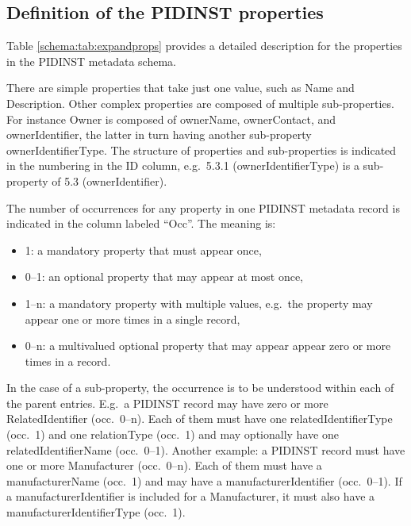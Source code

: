 \documentclass[titlepage=true,twoside=false,DIV=13]{scrartcl}
\begin{document}
\subsection{Definition of the PIDINST properties}

Table \ref{schema:tab:expandprops} provides a detailed description for
the properties in the PIDINST metadata schema.

There are simple properties that take just one value, such as Name and
Description.  Other complex properties are composed of multiple
sub-properties.  For instance Owner is composed of ownerName,
ownerContact, and ownerIdentifier, the latter in turn having another
sub-property ownerIdentifierType.  The structure of properties and
sub-properties is indicated in the numbering in the ID column,
e.g.\ 5.3.1 (ownerIdentifierType) is a sub-property of 5.3
(ownerIdentifier).

The number of occurrences for any property in one PIDINST metadata
record is indicated in the column labeled ``Occ''.  The meaning is:
\begin{itemize}
\item 1: a mandatory property that must appear once,
\item 0--1: an optional property that may appear at most once,
\item 1--n: a mandatory property with multiple values, e.g.\ the
  property may appear one or more times in a single record,
\item 0--n: a multivalued optional property that may appear appear zero
  or more times in a record.
\end{itemize}
In the case of a sub-property, the occurrence is to be understood
within each of the parent entries.  E.g.\ a PIDINST record may have
zero or more RelatedIdentifier (occ.\ 0--n).  Each of them must have
one relatedIdentifierType (occ.\ 1) and one relationType (occ.\ 1) and
may optionally have one relatedIdentifierName (occ.\ 0--1).  Another
example: a PIDINST record must have one or more Manufacturer
(occ.\ 0--n).  Each of them must have a manufacturerName (occ.\ 1) and
may have a manufacturerIdentifier (occ.\ 0--1).  If a
manufacturerIdentifier is included for a Manufacturer, it must also
have a manufacturerIdentifierType (occ.\ 1).

\newlength{\idcolw}\settowidth{\idcolw}{5.3.1}
\newlength{\propcolw}\settowidth{\propcolw}{instrumentTypeIdentifierType}
\newlength{\occcolw}
\newlength{\valcolw}\settowidth{\valcolw}{Controlled list of values:}
\setlength{\defcolw}{\textwidth}
\addtolength{\defcolw}{-\idcolw}
\addtolength{\defcolw}{-\propcolw}
\addtolength{\defcolw}{-\occcolw}
\addtolength{\defcolw}{-\valcolw}
\addtolength{\defcolw}{-10\tabcolsep}
\end{document}
